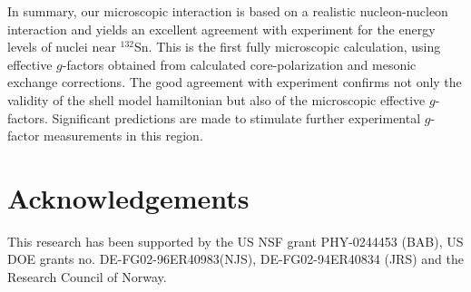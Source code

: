 \documentclass[aps,twocolumn,superscriptaddress,prc,showpacs]{revtex4}
\begin{document}
In summary, our microscopic interaction is based on a realistic nucleon-nucleon
interaction and yields an excellent agreement with experiment for the energy levels
of nuclei near $^{132}$Sn. This is the first fully microscopic calculation,
using effective $g$-factors obtained from calculated core-polarization and mesonic exchange corrections.
The good agreement with experiment confirms not only the validity of the shell
model hamiltonian but also of the microscopic effective $g$-factors.
Significant predictions are made to stimulate 
further experimental $g$-factor
measurements in this region.

\section{Acknowledgements}
This research has been supported by the US NSF grant PHY-0244453 (BAB),
US DOE grants no. DE-FG02-96ER40983(NJS), DE-FG02-94ER40834 (JRS) and the Research Council of Norway.
\end{document}
